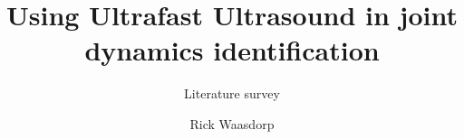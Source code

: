 \documentclass{tudelft-report}
\begin{document}
\frontmatter


\title[tudelft-white]{Using Ultrafast \mbox{Ultrasound} in joint dynamics \mbox{identification}}
\subtitle[tudelft-black]{Literature survey}
\author[tudelft-white]{Rick Waasdorp}




% 

\tableofcontents

\mainmatter





%  






%


\end{document}
